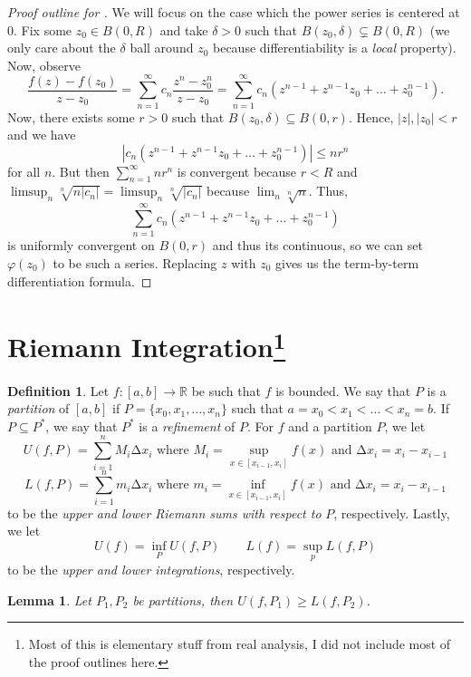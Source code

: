 \documentclass[letterpaper,12pt]{article}
\theoremstyle{definition}
\newtheorem{definition}{Definition}[section]
\theoremstyle{plain}
\newtheorem{lemma}[thm]{Lemma}
\theoremstyle{remark}
\let\oldDelta\Delta
\renewcommand{\Delta}{\mathrm{\oldDelta}}
\begin{document}
\begin{proof}[Proof outline for ]
We will focus on the case which the power series is centered at $0$. Fix some $z_0\in B(0,R)$ and take $\delta>0$ such that $B(z_0,\delta)\subsetneq B(0,R)$ (we only care about the $\delta$ ball around $z_0$ because differentiability is a \emph{local} property). Now, observe
\[\frac{f(z)-f(z_0)}{z-z_0} = \sum_{n=1}^\infty c_n\frac{z^n-z_0^n}{z-z_0} = \sum_{n=1}^\infty c_n(z^{n-1}+z^{n-1}z_0 + \ldots + z_0^{n-1}).\]
Now, there exists some $r>0$ such that $B(z_0,\delta)\subseteq B(0,r)$. Hence, $|z|,|z_0|<r$ and we have
\[|c_n(z^{n-1}+z^{n-1}z_0 + \ldots + z_0^{n-1})|\leq nr^n\]
for all $n$. But then $\sum_{n=1}^\infty nr^n$ is convergent because $r<R$ and $\limsup_n \sqrt[n]{n|c_n|} = \limsup_n \sqrt[n]{|c_n|}$ because $\lim_n \sqrt[n]{n}$. Thus, 
\[\sum_{n=1}^\infty c_n(z^{n-1}+z^{n-1}z_0 + \ldots + z_0^{n-1})\]
is uniformly convergent on $B(0,r)$ and thus its continuous, so we can set $\varphi(z_0)$ to be such a series. Replacing $z$ with $z_0$ gives us the term-by-term differentiation formula.
\end{proof}

\section[title]{Riemann Integration\footnote{Most of this is elementary stuff from real analysis, I did not include most of the proof outlines here.}}

\begin{definition}
Let $f:[a,b]\to \mathbb{R}$ be such that $f$ is bounded. We say that $P$ is a \emph{partition} of $[a,b]$ if $P=\{x_0,x_1,\ldots,x_n\}$ such that $a=x_0<x_1<\ldots<x_n=b$. If $P\subseteq P^*$, we say that $P^*$ is a \emph{refinement} of $P$. For $f$ and a partition $P$, we let
\[U(f,P) = \sum_{i=1}^n M_i\Delta x_i\text{ where }M_i = \sup_{x\in[x_{i-1},x_i]}f(x)\text{ and }\Delta x_i = x_i-x_{i-1}\]
\[L(f,P) = \sum_{i=1}^n m_i\Delta x_i\text{ where }m_i = \inf_{x\in[x_{i-1},x_i]}f(x)\text{ and }\Delta x_i = x_i-x_{i-1}\]
to be the \emph{upper and lower Riemann sums with respect to} $P$, respectively. Lastly, we let
\[U(f) = \inf_P U(f,P)\qquad L(f) = \sup_p L(f,P)\] 
to be the \emph{upper and lower integrations}, respectively.
\end{definition}

\begin{lemma}
Let $P_1,P_2$ be partitions, then $U(f,P_1)\geq L(f,P_2)$.
\end{lemma}
\end{document}
